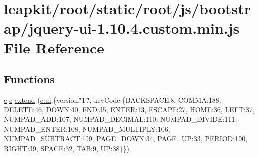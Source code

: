 \hypertarget{root_2static_2root_2js_2bootstrap_2jquery-ui-1_810_84_8custom_8min_8js}{\section{leapkit/root/static/root/js/bootstrap/jquery-\/ui-\/1.10.4.custom.\-min.\-js File Reference}
\label{root_2static_2root_2js_2bootstrap_2jquery-ui-1_810_84_8custom_8min_8js}
}
\subsection*{Functions}
\begin{DoxyCompactItemize}
\item 
\hyperlink{static_2root_2js_2jquery-ui_8custom_8min_8js_abea95a4e94bc6f4151d5683d4c12c3f4}{e} \hyperlink{static_2root_2js_2jquery-ui_8custom_8min_8js_abea95a4e94bc6f4151d5683d4c12c3f4}{e} \hyperlink{root_2static_2root_2js_2bootstrap_2jquery-ui-1_810_84_8custom_8min_8js_aceeaa2080d5a7df0cc8b259774f5a96a}{extend} (\hyperlink{static_2root_2js_2jquery-ui_8custom_8min_8js_a8ebc3a47bff7b1c2623695f3db4c0761}{e.\-ui},\{version\-:\char`\"{}1..\char`\"{}, key\-Code\-:\{B\-A\-C\-K\-S\-P\-A\-C\-E\-:8, C\-O\-M\-M\-A\-:188, D\-E\-L\-E\-T\-E\-:46, D\-O\-W\-N\-:40, E\-N\-D\-:35, E\-N\-T\-E\-R\-:13, E\-S\-C\-A\-P\-E\-:27, H\-O\-M\-E\-:36, L\-E\-F\-T\-:37, N\-U\-M\-P\-A\-D\-\_\-\-A\-D\-D\-:107, N\-U\-M\-P\-A\-D\-\_\-\-D\-E\-C\-I\-M\-A\-L\-:110, N\-U\-M\-P\-A\-D\-\_\-\-D\-I\-V\-I\-D\-E\-:111, N\-U\-M\-P\-A\-D\-\_\-\-E\-N\-T\-E\-R\-:108, N\-U\-M\-P\-A\-D\-\_\-\-M\-U\-L\-T\-I\-P\-L\-Y\-:106, N\-U\-M\-P\-A\-D\-\_\-\-S\-U\-B\-T\-R\-A\-C\-T\-:109, P\-A\-G\-E\-\_\-\-D\-O\-W\-N\-:34, P\-A\-G\-E\-\_\-\-U\-P\-:33, P\-E\-R\-I\-O\-D\-:190, R\-I\-G\-H\-T\-:39, S\-P\-A\-C\-E\-:32, T\-A\-B\-:9, U\-P\-:38\}\})
\item 

\end{DoxyCompactItemize}
